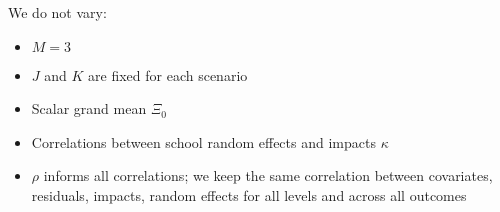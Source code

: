 \documentclass[
]{article}
\providecommand{\tightlist}{%
  \setlength{\itemsep}{0pt}\setlength{\parskip}{0pt}}
\begin{document}
We do not vary:

\begin{itemize}
\tightlist
\item
  \(M = 3\)
\item
  \(J\) and \(K\) are fixed for each scenario
\item
  Scalar grand mean \(\Xi_0\)
\item
  Correlations between school random effects and impacts \(\kappa\)
\item
  \(\rho\) informs all correlations; we keep the same correlation
  between covariates, residuals, impacts, random effects for all levels
  and across all outcomes
\end{itemize}
\end{document}
